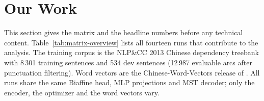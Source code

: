 \section{Our Work}
\label{sec:our_work}

This section gives the matrix and the headline numbers before any technical content. Table~\ref{tab:matrix-overview} lists all fourteen runs that contribute to the analysis. The training corpus is the NLP\&CC 2013 Chinese dependency treebank with 8\,301 training sentences and 534 dev sentences (12\,987 evaluable arcs after punctuation filtering). Word vectors are the Chinese-Word-Vectors release of \citet{li2018cwv}. All runs share the same Biaffine head, MLP projections and MST decoder; only the encoder, the optimizer and the word vectors vary.

\begin{table}[t]
\caption{Fourteen-run training matrix on the same dev set. The Adam BiLSTM baseline reaches $86.43$ UAS. The only configuration that surpasses it is the BiLSTM trained with Muon for $100$ epochs under warmup and cosine decay, while the largest Transformer stops at $83.92$ UAS. Under this 8.3K-sentence data scale, scaling the encoder underperforms scheduling the optimizer.}
\label{tab:matrix-overview}
\centering
\small
{}
\end{table}
